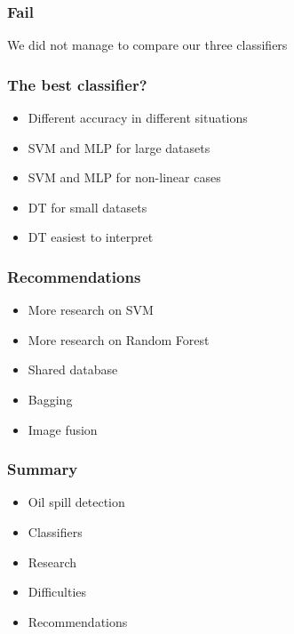 \documentclass{beamer}
\begin{document}

\begin{frame}
\frametitle{Fail}

	\centerline{We did not manage to compare our three classifiers}

\end{frame}


\begin{frame}
\frametitle{The best classifier?}

	\begin{itemize}
		\item Different accuracy in different situations
		\item SVM and MLP for large datasets
		\item SVM and MLP for non-linear cases
		\item DT for small datasets
		\item DT easiest to interpret
	\end{itemize}
	
\end{frame}

\begin{frame}
\frametitle{Recommendations}

	\begin{itemize}
		\item More research on SVM
		\item More research on Random Forest
		\item Shared database
		\item Bagging
		\item Image fusion
	\end{itemize}

\end{frame}


\begin{frame}
\frametitle{Summary}

	\begin{itemize}
		\item Oil spill detection
		\item Classifiers
		\item Research
		\item Difficulties
		\item Recommendations
	\end{itemize}

\end{frame}
\end{document}
